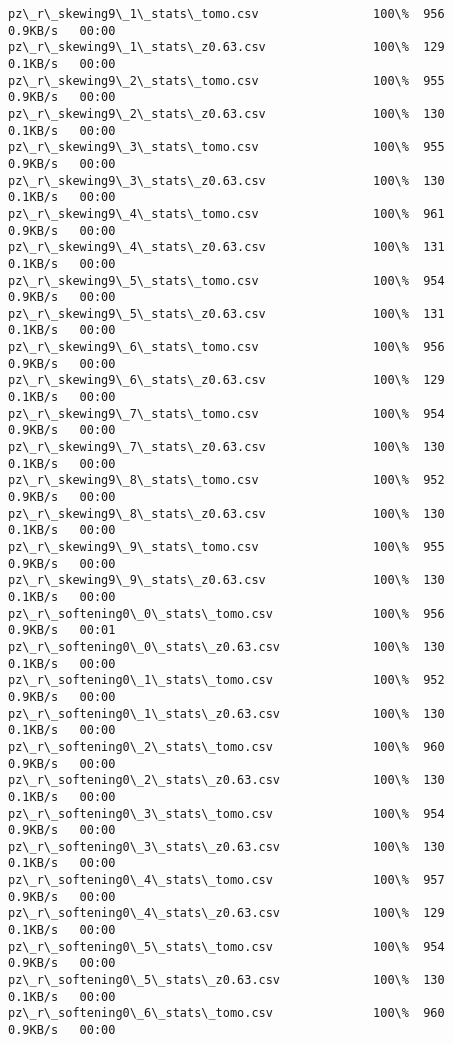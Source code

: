 \documentclass[11pt]{article}
\begin{document}
\begin{Verbatim}[commandchars=\\\{\}]
pz\_r\_skewing9\_1\_stats\_tomo.csv                100\%  956     0.9KB/s   00:00    
pz\_r\_skewing9\_1\_stats\_z0.63.csv               100\%  129     0.1KB/s   00:00    
pz\_r\_skewing9\_2\_stats\_tomo.csv                100\%  955     0.9KB/s   00:00    
pz\_r\_skewing9\_2\_stats\_z0.63.csv               100\%  130     0.1KB/s   00:00    
pz\_r\_skewing9\_3\_stats\_tomo.csv                100\%  955     0.9KB/s   00:00    
pz\_r\_skewing9\_3\_stats\_z0.63.csv               100\%  130     0.1KB/s   00:00    
pz\_r\_skewing9\_4\_stats\_tomo.csv                100\%  961     0.9KB/s   00:00    
pz\_r\_skewing9\_4\_stats\_z0.63.csv               100\%  131     0.1KB/s   00:00    
pz\_r\_skewing9\_5\_stats\_tomo.csv                100\%  954     0.9KB/s   00:00    
pz\_r\_skewing9\_5\_stats\_z0.63.csv               100\%  131     0.1KB/s   00:00    
pz\_r\_skewing9\_6\_stats\_tomo.csv                100\%  956     0.9KB/s   00:00    
pz\_r\_skewing9\_6\_stats\_z0.63.csv               100\%  129     0.1KB/s   00:00    
pz\_r\_skewing9\_7\_stats\_tomo.csv                100\%  954     0.9KB/s   00:00    
pz\_r\_skewing9\_7\_stats\_z0.63.csv               100\%  130     0.1KB/s   00:00    
pz\_r\_skewing9\_8\_stats\_tomo.csv                100\%  952     0.9KB/s   00:00    
pz\_r\_skewing9\_8\_stats\_z0.63.csv               100\%  130     0.1KB/s   00:00    
pz\_r\_skewing9\_9\_stats\_tomo.csv                100\%  955     0.9KB/s   00:00    
pz\_r\_skewing9\_9\_stats\_z0.63.csv               100\%  130     0.1KB/s   00:00    
pz\_r\_softening0\_0\_stats\_tomo.csv              100\%  956     0.9KB/s   00:01    
pz\_r\_softening0\_0\_stats\_z0.63.csv             100\%  130     0.1KB/s   00:00    
pz\_r\_softening0\_1\_stats\_tomo.csv              100\%  952     0.9KB/s   00:00    
pz\_r\_softening0\_1\_stats\_z0.63.csv             100\%  130     0.1KB/s   00:00    
pz\_r\_softening0\_2\_stats\_tomo.csv              100\%  960     0.9KB/s   00:00    
pz\_r\_softening0\_2\_stats\_z0.63.csv             100\%  130     0.1KB/s   00:00    
pz\_r\_softening0\_3\_stats\_tomo.csv              100\%  954     0.9KB/s   00:00    
pz\_r\_softening0\_3\_stats\_z0.63.csv             100\%  130     0.1KB/s   00:00    
pz\_r\_softening0\_4\_stats\_tomo.csv              100\%  957     0.9KB/s   00:00    
pz\_r\_softening0\_4\_stats\_z0.63.csv             100\%  129     0.1KB/s   00:00    
pz\_r\_softening0\_5\_stats\_tomo.csv              100\%  954     0.9KB/s   00:00    
pz\_r\_softening0\_5\_stats\_z0.63.csv             100\%  130     0.1KB/s   00:00    
pz\_r\_softening0\_6\_stats\_tomo.csv              100\%  960     0.9KB/s   00:00    

\end{Verbatim}
\end{document}
